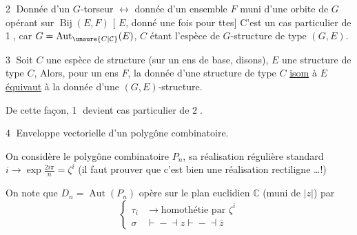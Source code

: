\textcircled{2} Donnée d'un $G$-torseur  $\longleftrightarrow$ donnée d'un ensemble $F$ muni d'une orbite de $G$ opérant sur $\operatorname{Bij}(E,F)$
[ $E$,   donné une fois pour ttes] C'est un cas particulier de \textcircled{1}, car $G=\operatorname{Aut}_{\unsure{C|\mathcal C}}(E)$, $C$ étant l'espèce de $G$-structure de type $(G,E)$.

\textcircled{3} Soit $C$ une espèce de structure (sur un ens de base, disons), $E$ une structure de type $C$,  Alors, pour un ens $F$, la donnée d'une structure de type $C$ \uline{isom} à $E$ \uline{équivaut} à la donnée d'une $(G,E)$-structure.

De cette façon, \textcircled{1} devient cas particulier de \textcircled{2}.

\textcircled{4} Enveloppe vectorielle d'un polygône combinatoire.

On considère le polygône  combinatoire  \deleted{$\unsure{[1,n]|[1,n[}$\unsure{,}} $P_n$, sa réalisation  régulière standard $i\longrightarrow\exp\frac{2i\pi}{n}=\zeta^i$ (il faut prouver que c'est bien une réalisation rectiligne \ldots !)

On note que $D_n=\operatorname{Aut}(P_n)$ opère sur  le plan euclidien  $\mathbb{C}$ (muni de $|z|$) par 
\[
\left\{\begin{aligned}
\tau_i &\longrightarrow \text{homothétie par }\zeta^i\\
\sigma &\mathrel{\vdash\!\!-\!\dashv} z\mathrel{\vdash\!\!-\!\dashv}\bar z
\end{aligned}\right.
\]
